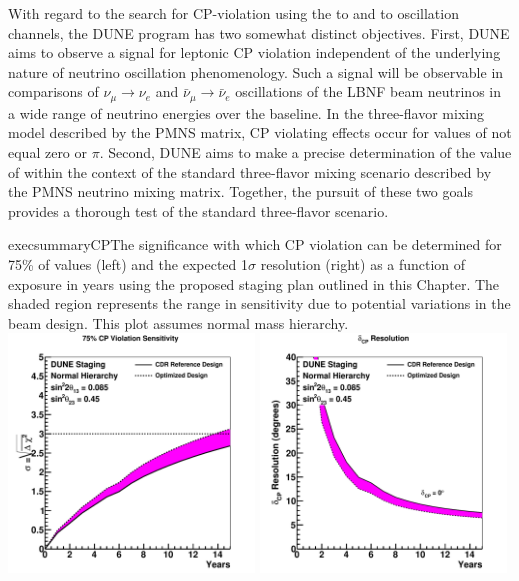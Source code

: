 With regard to the search for CP-violation using the \numu to \nue and
\anumu to \anue oscillation channels, the DUNE program has two
somewhat distinct objectives.  First, DUNE aims to observe a signal
for leptonic CP violation independent of the underlying nature of
neutrino oscillation phenomenology. Such a signal will be observable
in comparisons of $\nu_\mu \rightarrow \nu_e$ and $\bar{\nu}_{\mu}
\rightarrow \bar{\nu}_e$ oscillations of the LBNF beam neutrinos in a
wide range of neutrino energies over the  baseline. In the
three-flavor mixing model described by the PMNS matrix, CP violating
effects occur for values of \deltacp not equal zero or $\pi$. Second,
DUNE aims to make a precise determination of the value of \deltacp
within the context of the standard three-flavor mixing scenario
described by the PMNS neutrino mixing matrix. Together, the pursuit of
these two goals provides a thorough test of the standard three-flavor
scenario.
%
\begin{cdrfigure}{execsummaryCP}{The
    significance with which CP violation can be determined for 75\% of
    \deltacp values (left) and the expected 1$\sigma$ resolution
    (right) as a function of exposure in years using the proposed
    staging plan outlined in this Chapter. The shaded region
    represents the range in sensitivity due to potential variations in
    the beam design. This plot assumes normal mass hierarchy.}
\includegraphics[width=0.49\textwidth]{volume-physics/figures/cpv75_exp_staging15yr}
 \includegraphics[width=0.49\textwidth]{volume-physics/figures/dcp_exp_staging.pdf}
\end{cdrfigure}
